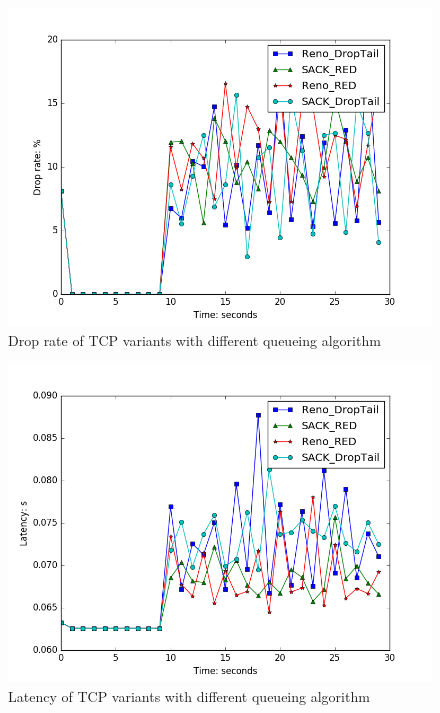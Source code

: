 \documentclass[10pt, conference]{IEEEtran/IEEEtran}
\begin{document}
\begin{figure}[htbp]
\begin{center}
\includegraphics[width=\linewidth]{../exp3/exp3_drop.png}
\caption{Drop rate of TCP variants with different queueing algorithm}
\label{exp3_drop}
\end{center}
\end{figure}

\begin{figure}[htbp]
\begin{center}
\includegraphics[width=\linewidth]{../exp3/exp3_lat.png}
\caption{Latency of TCP variants with different queueing algorithm}
\label{exp3_lat}
\end{center}
\end{figure}
\end{document}
